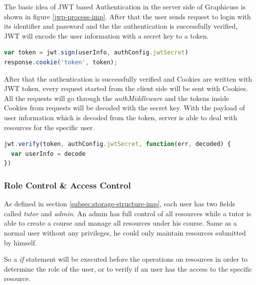 The basic idea of JWT based Authentication in the server side of Graphicuss is shown in figure \ref{jwp-process-imp}. After that the user sends request to login with its identifier and password and the the authentication is successfully verified, JWT will encode the user information with a secret key to a token.

\begin{lstlisting}[language=JavaScript, caption=JWT encodes user information with secret key, label={list:jwt-encode-imp}]
var token = jwt.sign(userInfo, authConfig.jwtSecret)
response.cookie('token', token);
\end{lstlisting}

After that the authentication is successfully verified and Cookies are written with JWT token, every request started from the client side will be sent with Cookies. All the requests will go through the \textit{authMiddleware} and the tokens inside Cookies from requests will be decoded with the secret key. With the payload of user information which is decoded from the token, server is able to deal with resources for the specific user.

\begin{lstlisting}[language=JavaScript, caption=JWT decodes user information with secret key, label={list:jwt-decode-imp}]
jwt.verify(token, authConfig.jwtSecret, function(err, decoded) {
  var userInfo = decode
})
\end{lstlisting}

\subsubsection{Role Control \& Access Control}
As defined in section \ref{subsec:storage-structure-imp}, each user has two fields called \textit{tutor} and \textit{admin}. An admin has full control of all resources while a tutor  is able to create a course and manage all resources under his course. Same as a normal user without any privileges, he could only maintain resources submitted by himself.

So a \textit{if} statement will be executed before the operations on resources in order to determine the role of the user, or to verify if an user has the access to the specific resource.




